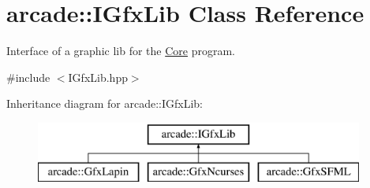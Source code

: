 \hypertarget{classarcade_1_1_i_gfx_lib}{}\section{arcade\+:\+:I\+Gfx\+Lib Class Reference}
\label{classarcade_1_1_i_gfx_lib}


Interface of a graphic lib for the \hyperlink{classarcade_1_1_core}{Core} program.  




{\ttfamily \#include $<$I\+Gfx\+Lib.\+hpp$>$}

Inheritance diagram for arcade\+:\+:I\+Gfx\+Lib\+:\begin{figure}[H]
\begin{center}
\leavevmode
\includegraphics[height=2.000000cm]{classarcade_1_1_i_gfx_lib}
\end{center}
\end{figure}
